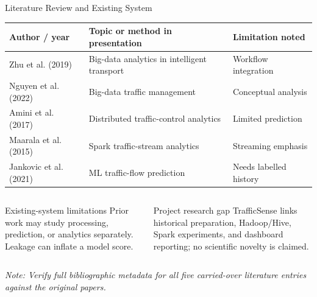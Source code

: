 \documentclass[aspectratio=169,11pt]{beamer}
\begin{document}
\begin{frame}{Literature Review and Existing System}
\scriptsize
\begin{tabularx}{\textwidth}{>{\raggedright\arraybackslash}p{} X X}
\toprule
\textbf{Author / year} & \textbf{Topic or method in presentation} & \textbf{Limitation noted} \\
\midrule
Zhu et al. (2019) & Big-data analytics in intelligent transport & Workflow integration \\
Nguyen et al. (2022) & Big-data traffic management & Conceptual analysis \\
Amini et al. (2017) & Distributed traffic-control analytics & Limited prediction \\
Maarala et al. (2015) & Spark traffic-stream analytics & Streaming emphasis \\
Jankovic et al. (2021) & ML traffic-flow prediction & Needs labelled history \\
\bottomrule
\end{tabularx}
\vspace{3mm}
\begin{columns}[T,onlytextwidth]
\begin{block}{Existing-system limitations}
Prior work may study processing, prediction, or analytics separately. Leakage can inflate a model score.
\end{block}

\hfill
{}
\begin{block}{Project research gap}
TrafficSense links historical preparation, Hadoop/Hive, Spark experiments, and dashboard reporting; no scientific novelty is claimed.
\end{block}
\end{columns}
\footnotesize\textit{Note: Verify full bibliographic metadata for all five carried-over literature entries against the original papers.}
\end{frame}
\end{document}
